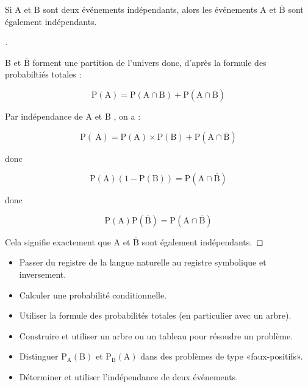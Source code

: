 \documentclass[12pt]{article}
\theoremstyle{break}
\newenvironment{demo}[1][\proofname]{%
  \begin{proof}[#1]$ $\newline
  }{%
  \end{proof}
}
\begin{document}
\begin{proposition}{}{}
Si $\mathrm{A}$ et $\mathrm{B}$ sont deux événements indépendants, alors les événements $\mathrm{A}$ et $\overline{\mathrm{B}}$ sont également indépendants.
\end{proposition}

\begin{demo}
B et $\overline{\mathrm{B}}$ forment une partition de l'univers donc, d'après la formule des probabiltiés totales :

$$
\mathrm{P}(\mathrm{A})=\mathrm{P}(\mathrm{A} \cap \mathrm{B})+\mathrm{P}(\mathrm{A} \cap \overline{\mathrm{B}})
$$

Par indépendance de A et B , on a :

$$
\mathrm{P}(\mathrm{~A})=\mathrm{P}(\mathrm{A}) \times \mathrm{P}(\mathrm{B})+\mathrm{P}(\mathrm{A} \cap \overline{\mathrm{B}})
$$

\newpage
donc

$$
\mathrm{P}(\mathrm{A})(1-\mathrm{P}(\mathrm{B}))=\mathrm{P}(\mathrm{A} \cap \overline{\mathrm{B}})
$$

donc

$$
\mathrm{P}(\mathrm{A}) \mathrm{P}(\overline{\mathrm{B}})=\mathrm{P}(\mathrm{A} \cap \overline{\mathrm{B}})
$$

Cela signifie exactement que A et $\overline{\mathrm{B}}$ sont également indépendants.
\end{demo}

\begin{savoir}{}{}
\begin{itemize}
  \item Passer du registre de la langue naturelle au registre symbolique et inversement.
  \item Calculer une probabilité conditionnelle.
  \item Utiliser la formule des probabilités totales (en particulier avec un arbre).
  \item Construire et utiliser un arbre ou un tableau pour résoudre un problème.
  \item Distinguer $\mathrm{P}_{\mathrm{A}}(\mathrm{B})$ et $\mathrm{P}_{\mathrm{B}}(\mathrm{A})$ dans des problèmes de type «faux-positifs».
  \item Déterminer et utiliser l'indépendance de deux événements.
\end{itemize}
\end{savoir}
\end{document}
